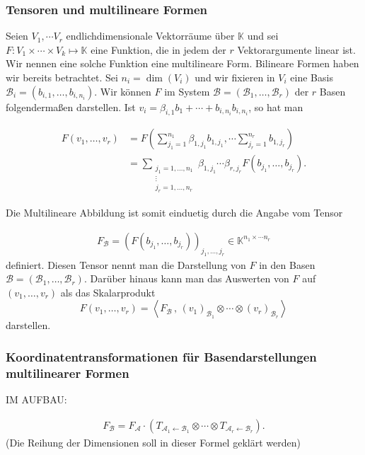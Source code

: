 \documentclass[
a4paper,landscape,16pt,
bibliography=totocnumbered,
numbers=noenddot,
]{scrartcl}
\numberwithin{equation}{subsection}
\newcommand{\K}{\mathbb K}
\newcommand{\cA}{\mathcal{A}}
\newcommand{\cB}{\mathcal{B}}
\theoremstyle{plain}
\theoremstyle{definition}
\begin{document}
\subsubsection{Tensoren und multilineare Formen} 

Seien $V_1, \cdots V_r$ endlichdimensionale Vektorräume über $\K$ und sei $F : V_1 \times \cdots \times V_k \mapsto \K$ eine Funktion, die in jedem der $r$ Vektorargumente linear ist. Wir nennen eine solche Funktion eine multilineare Form. Bilineare Formen haben wir bereits betrachtet. Sei $n_i  = \dim(V_i)$ und wir fixieren in $V_i$ eine Basis $\cB_i = (b_{i,1},\ldots, b_{i,n_i})$. Wir können $F$ im System $\cB= (\cB_1,\ldots,\cB_r)$ der $r$ Basen folgendermaßen darstellen. Ist $v_i = \beta_{i,1} b_1 + \cdots + b_{i,n_i} b_{i,n_i}$, so hat man 

\begin{align*}
	F(v_1,\ldots,v_r) & = F \left( \sum_{j_1=1}^{n_1} \beta_{1,j_1} b_{1,j_1}, \cdots \sum_{j_r=1}^{n_r} b_{1,j_r} \right) 
	\\ & = \sum_{ \substack{ j_1 =1,\ldots,n_1 \\ \vdots \\ j_r = 1,\ldots,n_r} } \beta_{1,j_1} \cdots \beta_{r,j_r} F(b_{j_1},\ldots, b_{j_r}). 
\end{align*}

Die Multilineare Abbildung ist somit einduetig durch die Angabe vom Tensor 

\begin{align*}
			F_\cB = \left( F(b_{j_1},\ldots, b_{j_r}) \right)_{j_1,\ldots,j_r} \in \K^{n_1 \times \cdots n_r}
\end{align*} 
definiert. Diesen Tensor nennt man die Darstellung von $F$ in den Basen $\cB=(\cB_1,\ldots,\cB_r)$.  Darüber hinaus kann man das Auswerten von $F$ auf $(v_1,\ldots,v_r)$ als das Skalarprodukt
\[
	F(v_1,\ldots,v_r) = \left< F_\cB \, , \, (v_1)_{\cB_1} \otimes \cdots \otimes (v_r)_{\cB_r} \right>
\]
darstellen. 

\subsubsection{Koordinatentransformationen für Basendarstellungen multilinearer Formen}

IM AUFBAU:  

\begin{align*}
	F_\cB = F_\cA \cdot ( T_{\cA_1 \leftarrow \cB_1}  \otimes \cdots \otimes T_{\cA_r \leftarrow \cB_r} ). 
\end{align*}
(Die Reihung der Dimensionen soll in dieser Formel geklärt werden)
\end{document}
